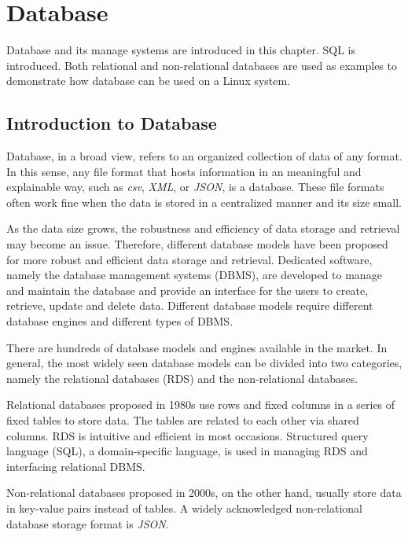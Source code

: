 \chapter{Database}

Database and its manage systems are introduced in this chapter. SQL is introduced. Both relational and non-relational databases are used as examples to demonstrate how database can be used on a Linux system.

\section{Introduction to Database}

Database, in a broad view, refers to an organized collection of data of any format. In this sense, any file format that hosts information in an meaningful and explainable way, such as \textit{csv}, \textit{XML}, or \textit{JSON}, is a database. These file formats often work fine when the data is stored in a centralized manner and its size small.

As the data size grows, the robustness and efficiency of data storage and retrieval may become an issue. Therefore, different database models have been proposed for more robust and efficient data storage and retrieval. Dedicated software, namely the database management systems (DBMS), are developed to manage and maintain the database and provide an interface for the users to create, retrieve, update and delete data. Different database models require different database engines and different types of DBMS.

There are hundreds of database models and engines available in the market. In general, the most widely seen database models can be divided into two categories, namely the relational databases (RDS) and the non-relational databases.

Relational databases proposed in 1980s use rows and fixed columns in a series of fixed tables to store data. The tables are related to each other via shared columns. RDS is intuitive and efficient in most occasions. Structured query language (SQL), a domain-specific language, is used in managing RDS and interfacing relational DBMS.

Non-relational databases proposed in 2000s, on the other hand, usually store data in key-value pairs instead of tables. A widely acknowledged non-relational database storage format is \textit{JSON}.

